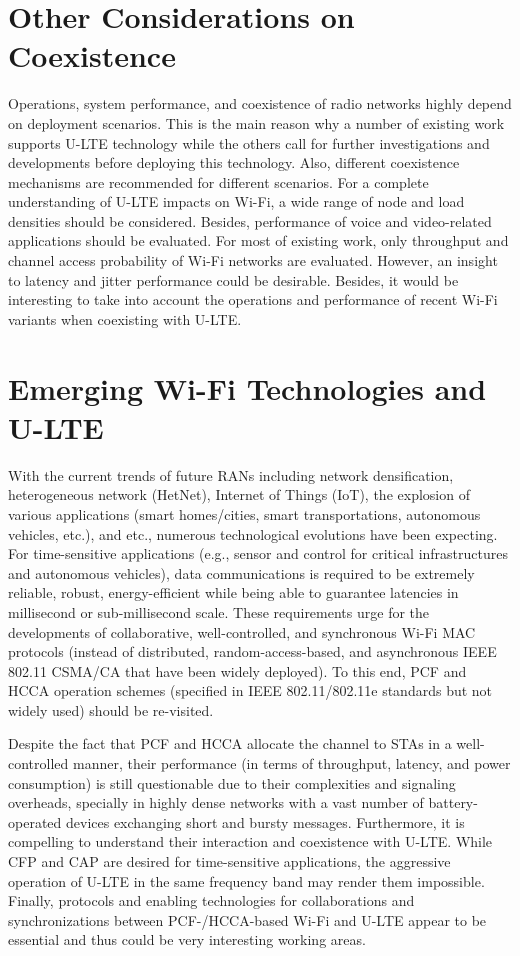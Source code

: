 \section{Other Considerations on Coexistence}
Operations, system performance, and coexistence of radio networks highly depend on deployment scenarios. This is the main reason why a number of existing work supports \mbox{U-LTE} technology while the others call for further investigations and developments before deploying this technology. Also, different coexistence mechanisms are recommended for different scenarios. For a complete understanding of \mbox{U-LTE} impacts on \mbox{Wi-Fi}, a wide range of node and load densities should be considered. Besides, performance of voice and video-related applications should be evaluated. For most of existing work, only throughput and channel access probability of \mbox{Wi-Fi} networks are evaluated. However, an insight to latency and jitter performance could be desirable. Besides, it would be interesting to take into account the operations and performance of recent \mbox{Wi-Fi} variants when coexisting with \mbox{U-LTE}.

\section{Emerging Wi-Fi Technologies and U-LTE}
With the current trends of future RANs including network densification, heterogeneous network (HetNet), Internet of Things (IoT), the explosion of various applications (smart homes/cities, smart transportations, autonomous vehicles, etc.), and etc., numerous technological evolutions have been expecting. For time-sensitive applications (e.g., sensor and control for critical infrastructures and autonomous vehicles), data communications is required to be extremely reliable, robust, energy-efficient while being able to guarantee latencies in millisecond or sub-millisecond scale. These requirements urge for the developments of collaborative, well-controlled, and synchronous \mbox{Wi-Fi} MAC protocols (instead of distributed, random-access-based, and asynchronous IEEE 802.11 CSMA/CA that have been widely deployed). To this end, PCF and HCCA operation schemes (specified in IEEE 802.11/802.11e standards but not widely used) should be re-visited.

Despite the fact that PCF and HCCA allocate the channel to STAs in a well-controlled manner, their performance (in terms of throughput, latency, and power consumption) is still questionable due to their complexities and signaling overheads, specially in highly dense networks with a vast number of battery-operated devices exchanging short and bursty messages. Furthermore, it is compelling to understand their interaction and coexistence with \mbox{U-LTE}. While CFP and CAP are desired for time-sensitive applications, the aggressive operation of \mbox{U-LTE} in the same frequency band may render them impossible. Finally, protocols and enabling technologies for collaborations and synchronizations between PCF-/HCCA-based \mbox{Wi-Fi} and \mbox{U-LTE} appear to be essential and thus could be very interesting working areas.

